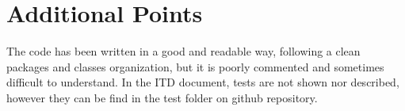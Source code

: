 \chapter{Additional Points}

The code has been written in a good and readable way, following a clean packages and classes organization, but it is poorly commented and sometimes difficult to understand. 
In the ITD document, tests are not shown nor described, however they can be find in the test folder on github repository.